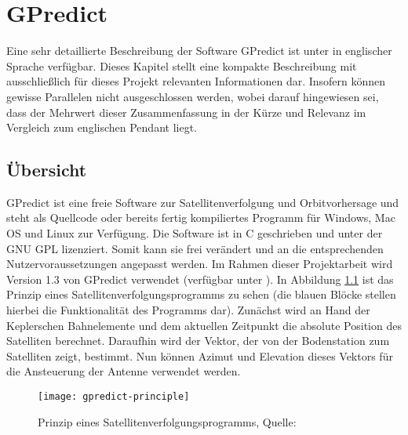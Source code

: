 
\chapter{GPredict}

Eine sehr detaillierte Beschreibung der Software GPredict ist unter \cite{gpredictmanual} in englischer Sprache verfügbar. Dieses Kapitel stellt eine kompakte Beschreibung mit ausschließlich für dieses Projekt relevanten Informationen dar. Insofern können gewisse Parallelen nicht ausgeschlossen werden, wobei darauf hingewiesen sei, dass der Mehrwert dieser Zusammenfassung in der Kürze und Relevanz im Vergleich zum englischen Pendant liegt.

\section{Übersicht}

GPredict ist eine freie Software zur Satellitenverfolgung und Orbitvorhersage und steht als Quellcode oder bereits fertig kompiliertes Programm für Windows, Mac OS und Linux zur Verfügung. Die Software ist in C geschrieben und unter der GNU \ac{GPL} lizenziert. Somit kann sie frei verändert und an die entsprechenden Nutzervoraussetzungen angepasst werden. Im Rahmen dieser Projektarbeit wird Version 1.3 von GPredict verwendet (verfügbar unter \cite{gpredictdownload}).\newpar
In Abbildung \ref{fig:gpredict-principle} ist das Prinzip eines Satellitenverfolgungsprogramms zu sehen (die blauen Blöcke stellen hierbei die Funktionalität des Programms dar). Zunächst wird an Hand der Keplerschen Bahnelemente und dem aktuellen Zeitpunkt die absolute Position des Satelliten berechnet. Daraufhin wird der Vektor, der von der Bodenstation zum Satelliten zeigt, bestimmt. Nun können Azimut und Elevation dieses Vektors für die Ansteuerung der Antenne verwendet werden.

\begin{figure}[h]
	\centering
	\texttt{[image: gpredict-principle]}
	\caption[Prinzip eines Satellitenverfolgungsprogramms]{Prinzip eines Satellitenverfolgungsprogramms, Quelle: \cite{gpredictmanual}}
	\label{fig:gpredict-principle} 
\end{figure}

